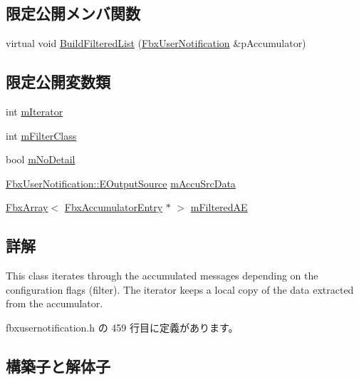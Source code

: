 \subsection*{限定公開メンバ関数}
\begin{DoxyCompactItemize}
\item 
virtual void \hyperlink{class_fbx_user_notification_filtered_iterator_ab4aeac096dc929ed94aebe72506524ef}{Build\+Filtered\+List} (\hyperlink{class_fbx_user_notification}{Fbx\+User\+Notification} \&p\+Accumulator)
\end{DoxyCompactItemize}
\subsection*{限定公開変数類}
\begin{DoxyCompactItemize}
\item 
int \hyperlink{class_fbx_user_notification_filtered_iterator_a00fa9fbeceeddef4d6622bc95c9941b9}{m\+Iterator}
\item 
int \hyperlink{class_fbx_user_notification_filtered_iterator_ab0e224a4d178349530d2157753139d63}{m\+Filter\+Class}
\item 
bool \hyperlink{class_fbx_user_notification_filtered_iterator_ab38143eb6742f98d8462fdb83b9f6616}{m\+No\+Detail}
\item 
\hyperlink{class_fbx_user_notification_a45290aa788e47fce1d7b8a88687aa184}{Fbx\+User\+Notification\+::\+E\+Output\+Source} \hyperlink{class_fbx_user_notification_filtered_iterator_a817f4766f2b7475c68fb596388eed438}{m\+Accu\+Src\+Data}
\item 
\hyperlink{class_fbx_array}{Fbx\+Array}$<$ \hyperlink{class_fbx_accumulator_entry}{Fbx\+Accumulator\+Entry} $\ast$ $>$ \hyperlink{class_fbx_user_notification_filtered_iterator_a1f1ac151c2005704078362ed3a588399}{m\+Filtered\+AE}
\end{DoxyCompactItemize}


\subsection{詳解}
This class iterates through the accumulated messages depending on the configuration flags (filter). The iterator keeps a local copy of the data extracted from the accumulator. 

 fbxusernotification.\+h の 459 行目に定義があります。



\subsection{構築子と解体子}
\mbox{\label{class_fbx_user_notification_filtered_iterator_a6e10f51f22b5d4e32fb4acfc4492091f}} 
